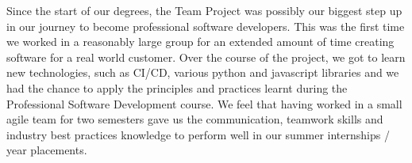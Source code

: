 \documentclass{l3proj}
\begin{document}
Since the start of our degrees, the Team Project was possibly our biggest step up in our journey to become professional software developers. This was the first time we worked in a reasonably large group for an extended amount of time creating software for a real world customer. Over the course of the project, we got to learn new technologies, such as CI/CD, various python and javascript libraries and we had the chance to apply the principles and practices learnt during the Professional Software Development course. We feel that having worked in a small agile team for two semesters gave us the communication, teamwork skills and industry best practices knowledge to perform well in our summer internships / year placements.




\end{document}
